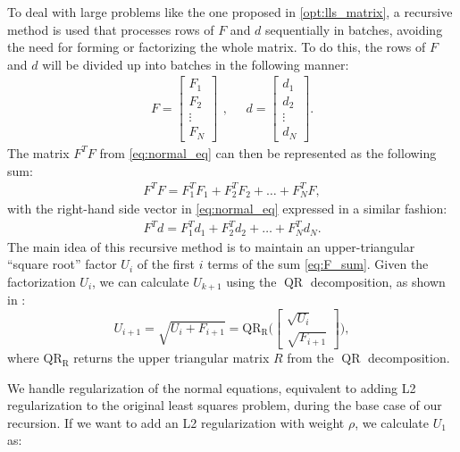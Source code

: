 \documentclass{article}
\begin{document}
To deal with large problems like the one proposed in \eqref{opt:lls_matrix}, a recursive
method is used that processes rows of $F$ and $d$ sequentially in batches, avoiding the need
for forming or factorizing the whole matrix. To do this, the rows of $F$ and $d$ will be
divided up into batches in the following manner:
\begin{equation}
  \begin{aligned}
    F = \begin{bmatrix} F_1 \\ F_2 \\ \vdots \\ F_N \end{bmatrix}
  \end{aligned},
  \quad 
  \begin{aligned}
    d = \begin{bmatrix} d_1 \\ d_2 \\ \vdots \\ d_N \end{bmatrix}.
  \end{aligned}
\end{equation}
The matrix $F^TF$ from \eqref{eq:normal_eq} can then be represented as the following sum:
\begin{align} \label{eq:F_sum}
  F^TF = F_1^TF_1 + F_2^TF_2 + \ldots + F_N^TF,
\end{align}
with the right-hand side vector in \eqref{eq:normal_eq} expressed in a similar fashion:
\begin{align}
  F^Td = F_1^Td_1 + F_2^Td_2 + \ldots + F_N^Td_N.
\end{align}
The main idea of this recursive method is to maintain an upper-triangular ``square root''
factor $U_i$ of the first $i$ terms of the sum \eqref{eq:F_sum}. Given the factorization 
$U_i$, we can calculate $U_{k+1}$ using the $\operatorname{QR}$ decomposition, as shown in
\cite{Howell2019}:
\begin{equation}
  U_{i+1} = \sqrt{U_i + F_{i+1}} = 
  \operatorname{QR_R}\bigg( \begin{bmatrix} \sqrt{U_i} \\ \sqrt{F_{i+1}} \end{bmatrix} \bigg),
\end{equation}
where $\operatorname{QR_R}$ returns the upper triangular matrix $R$ from the 
$\operatorname{QR}$ decomposition. 

We handle regularization of the normal equations, equivalent to adding L2 regularization to 
the original least squares problem, during the base case of our recursion. If we want to 
add an L2 regularization with weight $\rho$, we calculate $U_1$ as:
\end{document}
